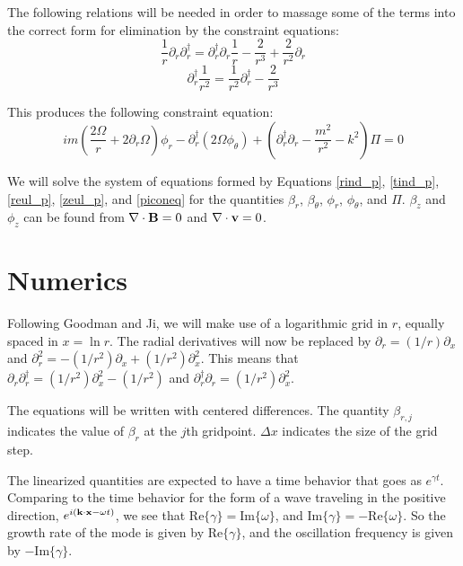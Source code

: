 \documentclass[letterpaper]{article}
\begin{document}
The following relations will be needed in order to massage some of the
terms into the correct form for elimination by the constraint
equations:
\begin{equation}
\frac{1}{r}\partial_r \partial_r^\dagger = \partial_r^\dagger \partial_r \frac{1}{r} - \frac{2}{r^3} + \frac{2}{r^2}\partial_r
\end{equation}
\begin{equation}
\partial_r^\dagger \frac{1}{r^2} = \frac{1}{r^2} \partial_r^\dagger - \frac{2}{r^3}
\end{equation}

This produces the following constraint equation:
\begin{equation}\label{piconeq}
im\left(\frac{2\Omega}{r}+2\partial_r \Omega\right)\phi_r - \partial_r^\dagger\left(2\Omega\phi_\theta\right)+\left(\partial_r^\dagger \partial_r - \frac{m^2}{r^2}-k^2\right)\Pi = 0
\end{equation}

We will solve the system of equations formed by Equations
\ref{rind_p}, \ref{tind_p}, \ref{reul_p}, \ref{zeul_p}, and
\ref{piconeq} for the quantities $\beta_r$, $\beta_\theta$, $\phi_r$,
$\phi_\theta$, and $\Pi$.  $\beta_z$ and $\phi_z$ can be found from
$\nabla\cdot{\bf B}=0$ and $\nabla\cdot{\bf v}=0$.
\section{Numerics}

Following Goodman and Ji, we will make use of a logarithmic grid in
$r$, equally spaced in $x=\ln{r}$.  The radial derivatives will now be
replaced by $\partial_r = (1/r)\partial_x$ and $\partial_r^2 =
-(1/r^2)\partial_x + (1/r^2)\partial_x^2$.  This means that
$\partial_r \partial_r^\dagger = (1/r^2)\partial_x^2 - (1/r^2)$ and
$\partial_r^\dagger \partial_r = (1/r^2)\partial_x^2$.

The equations will be written with centered differences.  The quantity
$\beta_{r,j}$ indicates the value of $\beta_r$ at the $j$th
gridpoint. $\Delta x$ indicates the size of the grid step.

The linearized quantities are expected to have a time behavior that
goes as $e^{\gamma t}$. Comparing to the time behavior for the form of
a wave traveling in the positive direction,
$e^{i({\bf k} \cdot {\bf x} - \omega t)}$, we see that
$\mathrm{Re}\{\gamma\} = \mathrm{Im}\{\omega\}$, and
$\mathrm{Im}\{\gamma\} = -\mathrm{Re}\{\omega\}$. So the growth rate of the
mode is given by $\mathrm{Re}\{\gamma\}$, and the oscillation frequency is
given by $-\mathrm{Im}\{\gamma\}$.
\end{document}
